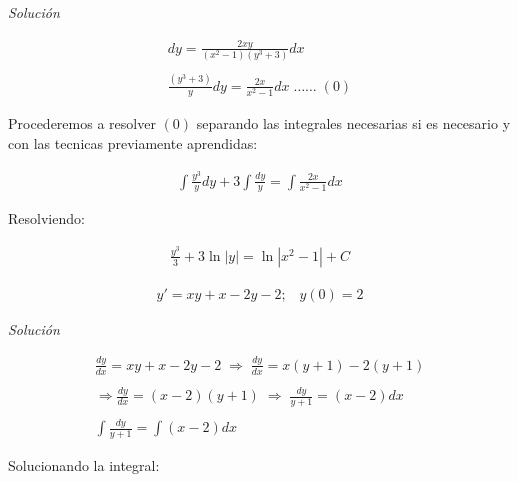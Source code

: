 \textit{Solución}

\begin{equation*}
    \begin{gathered}
        dy=\frac{2xy}{(x^{2}-1)(y^{3}+3)}dx\\\\
        \frac{(y^{3}+3)}{y}dy=\frac{2x}{x^{2}-1}dx \;\ldots\ldots\;(0)
    \end{gathered}
\end{equation*}

Procederemos a resolver \(\displaystyle (0)\) separando las integrales necesarias si es necesario y con las tecnicas previamente aprendidas:

\begin{equation*}
    \begin{gathered}
        \int\frac{y^{3}}{y}dy+3\int\frac{dy}{y}=\int\frac{2x}{x^{2}-1}dx
    \end{gathered}
\end{equation*}

Resolviendo:

\begin{equation*}
    \begin{gathered}
        \frac{y^{3}}{3}+3\ln\left|y\right|=\ln\left|x^{2}-1\right|+C
    \end{gathered}
\end{equation*}

\vspace{1cm}

\begin{equation}
    \begin{gathered}
        y'=xy+x-2y-2;\;\;\;y(0)=2
    \end{gathered}
\end{equation}

\textit{Solución}

\begin{equation*}
    \begin{gathered}
        \frac{dy}{dx}=xy+x-2y-2 \;\Rightarrow\;\frac{dy}{dx}=x(y+1)-2(y+1)\\\\
        \Rightarrow\frac{dy}{dx}=(x-2)(y+1)\;\Rightarrow\;\frac{dy}{y+1}=(x-2)dx\\\\
        \int\frac{dy}{y+1}=\int(x-2)dx
    \end{gathered}
\end{equation*}

Solucionando la integral:

